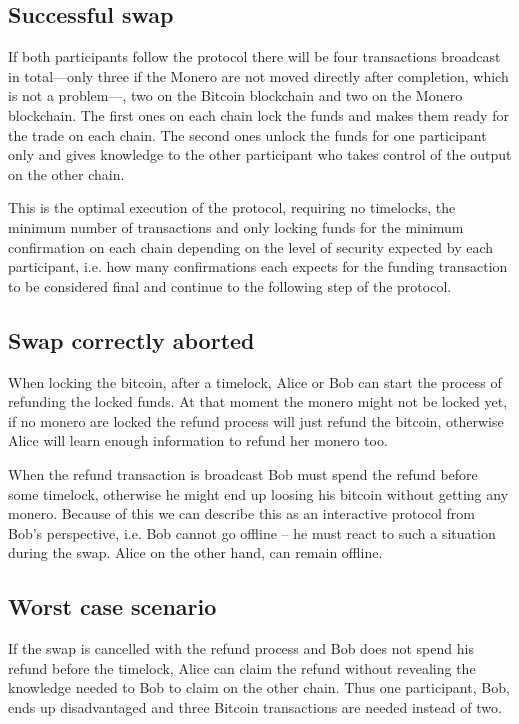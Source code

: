 \documentclass{llncs}
\begin{document}
\subsection{Successful swap}
If both participants follow the protocol there will be four transactions broadcast in total---only three if the Monero are not moved directly after completion, which is not a problem---, two on the Bitcoin blockchain and two on the Monero blockchain. The first ones on each chain lock the funds and makes them ready for the trade on each chain. The second ones unlock the funds for one participant only and gives knowledge to the other participant who takes control of the output on the other chain.

This is the optimal execution of the protocol, requiring no timelocks, the minimum number of transactions and only locking funds for the minimum confirmation on each chain depending on the level of security expected by each participant, i.e. how many confirmations each expects for the funding transaction to be considered final and continue to the following step of the protocol.

\subsection{Swap correctly aborted}
When locking the bitcoin, after a timelock, Alice or Bob can start the process of refunding the locked funds. At that moment the monero might not be locked yet, if no monero are locked the refund process will just refund the bitcoin, otherwise Alice will learn enough information to refund her monero too.

When the refund transaction is broadcast Bob must spend the refund before some timelock, otherwise he might end up loosing his bitcoin without getting any monero.  Because of this we can describe this as an interactive protocol from Bob's perspective, i.e. Bob cannot go offline -- he must react to such a situation during the swap. Alice on the other hand, can remain offline.

\subsection{Worst case scenario}
If the swap is cancelled with the refund process and Bob does not spend his refund before the timelock, Alice can claim the refund without revealing the knowledge needed to Bob to claim on the other chain. Thus one participant, Bob, ends up disadvantaged and three Bitcoin transactions are needed instead of two.
\end{document}
